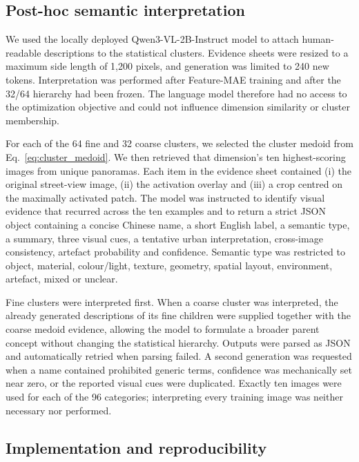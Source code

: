 \subsection{Post-hoc semantic interpretation}
\label{sec:semantic_interpretation}

We used the locally deployed Qwen3-VL-2B-Instruct model
\cite{bai2025qwen3vl} to attach human-readable descriptions to the statistical
clusters. Evidence sheets were resized to a maximum side length of 1,200 pixels,
and generation was limited to 240 new tokens. Interpretation was performed after
Feature-MAE training and after the
32/64 hierarchy had been frozen. The language model therefore had no access to
the optimization objective and could not influence dimension similarity or
cluster membership.

For each of the 64 fine and 32 coarse clusters, we selected the cluster medoid
from Eq.~\ref{eq:cluster_medoid}. We then retrieved that dimension's ten
highest-scoring images from unique panoramas. Each item in the evidence sheet
contained (i) the original street-view image, (ii) the activation overlay and
(iii) a crop centred on the maximally activated patch. The model was instructed
to identify visual evidence that recurred across the ten examples and to return
a strict JSON object containing a concise Chinese name, a short English label,
a semantic type, a summary, three visual cues, a tentative urban interpretation,
cross-image consistency, artefact probability and confidence. Semantic type was
restricted to object, material, colour/light, texture, geometry, spatial layout,
environment, artefact, mixed or unclear.

Fine clusters were interpreted first. When a coarse cluster was interpreted,
the already generated descriptions of its fine children were supplied together
with the coarse medoid evidence, allowing the model to formulate a broader
parent concept without changing the statistical hierarchy. Outputs were parsed
as JSON and automatically retried when parsing failed. A second generation was
requested when a name contained prohibited generic terms, confidence was
mechanically set near zero, or the reported visual cues were duplicated. Exactly
ten images were used for each of the 96 categories; interpreting every training
image was neither necessary nor performed.

\subsection{Implementation and reproducibility}
\label{sec:implementation}

